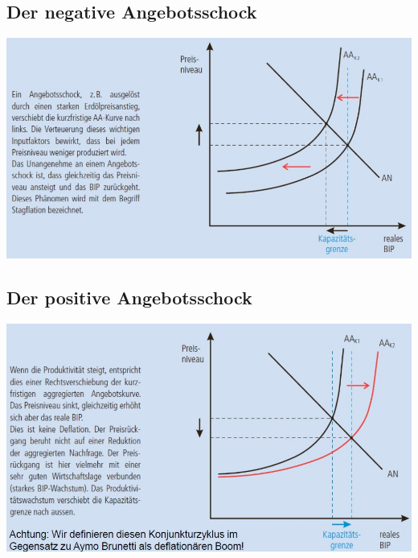 \subsection{Der negative Angebotsschock}
\includegraphics[width=0.9\linewidth]{images/negangebot.jpg}
\subsection{Der positive Angebotsschock}
\includegraphics[width=0.9\linewidth]{images/posangebot.jpg}
